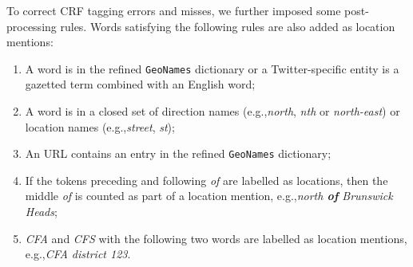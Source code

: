\documentclass[11pt]{article}
\newcommand{\eg}{e.g.,\xspace}
\newcommand{\geoname}{\texttt{GeoNames}\xspace}
\newcommand{\myex}[1]{\textit{#1}}
\begin{document}
To correct CRF tagging errors and misses, we further imposed some post-processing rules.
Words satisfying the following rules are also added as location mentions:

\begin{enumerate}
\item A word is in the refined \geoname dictionary or a Twitter-specific entity is a gazetted term combined with an English word;
\item A word is in a closed set of direction names (\eg \myex{north}, \myex{nth} or \myex{north-east}) or location names (\eg \myex{street}, \myex{st});
\item An URL contains an entry in the refined \geoname dictionary;
\item If the tokens preceding and following \myex{of} are labelled as locations, then the middle \myex{of} is counted as part of a location mention, \eg \myex{north \textbf{of} Brunswick Heads};
\item \myex{CFA} and \myex{CFS} with the following two words are labelled as location mentions, \eg \myex{CFA district 123}.
\end{enumerate}
\end{document}
